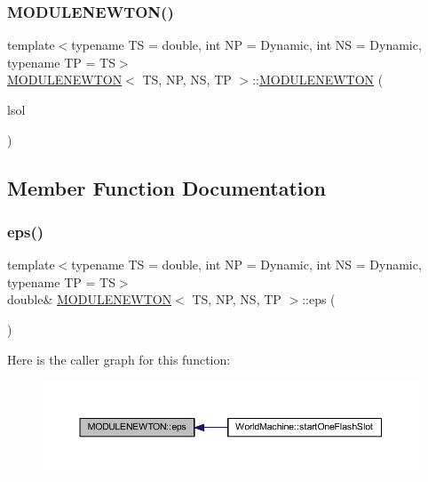 \subsubsection{\texorpdfstring{M\+O\+D\+U\+L\+E\+N\+E\+W\+T\+O\+N()}{MODULENEWTON()}}
{\footnotesize\ttfamily template$<$typename TS = double, int NP = Dynamic, int NS = Dynamic, typename TP = TS$>$ \\
\mbox{\hyperlink{class_m_o_d_u_l_e_n_e_w_t_o_n}{M\+O\+D\+U\+L\+E\+N\+E\+W\+T\+ON}}$<$ TS, NP, NS, TP $>$\+::\mbox{\hyperlink{class_m_o_d_u_l_e_n_e_w_t_o_n}{M\+O\+D\+U\+L\+E\+N\+E\+W\+T\+ON}} (\begin{DoxyParamCaption}\item[{\mbox{\hyperlink{class_l_i_n_e_a_r___s_o_l_v_e_r}{L\+I\+N\+E\+A\+R\+\_\+\+S\+O\+L\+V\+ER}}$<$ TS, NS $>$ \&}]{lsol }\end{DoxyParamCaption})\hspace{0.3cm}{\ttfamily [inline]}}



\subsection{Member Function Documentation}
\mbox{\label{class_m_o_d_u_l_e_n_e_w_t_o_n_a2df80239a016b8216c167bfe026e76b4}} 
\subsubsection{\texorpdfstring{eps()}{eps()}}
{\footnotesize\ttfamily template$<$typename TS = double, int NP = Dynamic, int NS = Dynamic, typename TP = TS$>$ \\
double\& \mbox{\hyperlink{class_m_o_d_u_l_e_n_e_w_t_o_n}{M\+O\+D\+U\+L\+E\+N\+E\+W\+T\+ON}}$<$ TS, NP, NS, TP $>$\+::eps (\begin{DoxyParamCaption}{ }\end{DoxyParamCaption})\hspace{0.3cm}{\ttfamily [inline]}}

Here is the caller graph for this function\+:\nopagebreak
\begin{figure}[H]
\begin{center}
\leavevmode
\includegraphics[width=350pt]{class_m_o_d_u_l_e_n_e_w_t_o_n_a2df80239a016b8216c167bfe026e76b4_icgraph}
\end{center}
\end{figure}
\mbox{\label{class_m_o_d_u_l_e_n_e_w_t_o_n_a8c3da4880abb18ae9e99854c21335e20}} 
